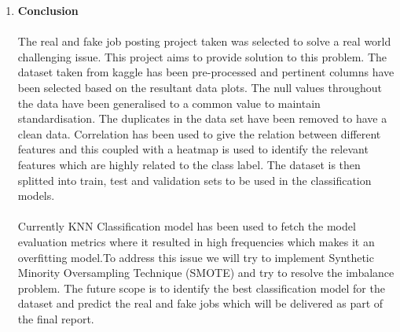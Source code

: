 \documentclass{article}
\begin{document}
\begin{enumerate}[wide, labelwidth=!, labelindent=0pt]
        \item \textbf{Conclusion}\\\\
        The real and fake job posting project taken was selected to solve a real world challenging issue. This project aims to provide solution to this problem. The dataset taken from kaggle has been pre-processed and pertinent columns have been selected based on the resultant data plots. The null values throughout the data have been generalised to a common value to maintain standardisation. The duplicates in the data set have been removed to have a clean data. Correlation has been used to give the relation between different features and this coupled with a heatmap is used to identify the relevant features which are highly related to the class label. The dataset is then splitted into train, test and validation sets to be used in the classification models.\\\\ 
        Currently KNN Classification model has been used to fetch the model evaluation metrics where it resulted in high frequencies which makes it an overfitting model.To address this issue we will try to implement Synthetic Minority Oversampling Technique (SMOTE) and try to resolve the imbalance problem. The future scope is to identify the best classification model for the dataset and predict the real and fake jobs which will be delivered as part of the final report.\\\\

    \end{enumerate}
\end{document}

